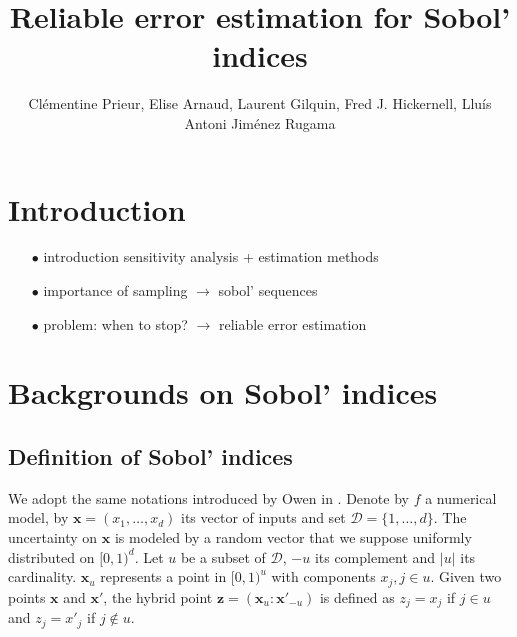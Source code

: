\documentclass[]{elsarticle}
\theoremstyle{definition}
\newcommand{\cube}{[0,1)^d}
\newcommand{\bvec}[1]{\boldsymbol{#1}}
\newcommand{\vx}{\bvec{x}}
\newcommand{\vz}{\bvec{z}}
\begin{document}
\begin{frontmatter}

\title{Reliable error estimation for Sobol' indices}

\author{Cl\'ementine Prieur, Elise Arnaud, Laurent Gilquin, Fred J. Hickernell, Llu\'{i}s Antoni Jim\'{e}nez Rugama}
\address{U. Josef Fourier, Illinois Institute of Technology}
\begin{abstract}
\end{abstract}

\end{frontmatter}

\section{Introduction}

\begin{itemize}
\item[$\bullet$] introduction sensitivity analysis + estimation methods
\item[$\bullet$] importance of sampling $\rightarrow$ sobol' sequences
\item[$\bullet$] problem: when to stop? $\rightarrow$ reliable error estimation 
\end{itemize}

\section{Backgrounds on Sobol' indices}

\subsection{Definition of Sobol' indices}
We adopt the same notations introduced by Owen in \cite{Owen}. Denote by $f$ a numerical model, by $\vx=(x_1,\dots,x_d)$ its vector of inputs and set $\mathcal{D}=\{1,\dots,d\}$. The uncertainty on $\vx$ is modeled by a random vector that we suppose uniformly distributed on $\cube$. Let $u$ be a subset of $\mathcal{D}$, $-u$ its complement and $|u|$ its cardinality. $\vx_u$ represents a point in $[0,1)^u$ with components $x_j, j \in u$. Given two points $\vx$ and $\vx'$, the hybrid point $\vz=(\vx_u:{\vx'}_{-u})$ is defined as $z_j=x_j$ if $j \in u$ and $z_j={x'}_j$ if $j \notin u$.
\end{document}
